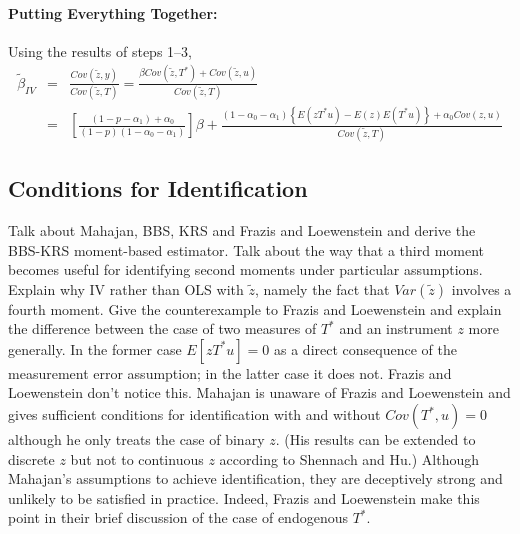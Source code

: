 \paragraph{Putting Everything Together:}
Using the results of steps 1--3,  
\begin{eqnarray*}
  \widetilde{\beta}_{IV} &=&  \frac{Cov\left( \widetilde{z},y \right)}{Cov(\widetilde{z},T)} = \frac{\beta Cov(\widetilde{z},T^*) + Cov(\widetilde{z},u)}{Cov(\widetilde{z},T)} \\
  &=& \left[\frac{(1- p - \alpha_1) + \alpha_0}{(1-p)(1 - \alpha_0 - \alpha_1)}\right]\beta + \frac{\left( 1-\alpha_0 - \alpha_1 \right)\left\{ E\left( zT^*u \right) - E(z)E(T^*u) \right\} + \alpha_0 Cov(z,u)}{Cov(\widetilde{z},T)}
\end{eqnarray*}

\subsection{Conditions for Identification}
Talk about Mahajan, BBS, KRS and Frazis and Loewenstein and derive the BBS-KRS moment-based estimator.
Talk about the way that a third moment becomes useful for identifying second moments under particular assumptions.
Explain why IV rather than OLS with $\widetilde{z}$, namely the fact that $Var(\widetilde{z})$ involves a fourth moment.
Give the counterexample to Frazis and Loewenstein and explain the difference between the case of two measures of $T^*$ and an instrument $z$ more generally.
In the former case $E[zT^*u]=0$ as a direct consequence of the measurement error assumption; in the latter case it does not.
Frazis and Loewenstein don't notice this.
Mahajan is unaware of Frazis and Loewenstein and gives sufficient conditions for identification with and without $Cov(T^*,u)=0$ although he only treats the case of binary $z$.
(His results can be extended to discrete $z$ but not to continuous $z$ according to Shennach and Hu.)
Although Mahajan's assumptions to achieve identification, they are deceptively strong and unlikely to be satisfied in practice.
Indeed, Frazis and Loewenstein make this point in their brief discussion of the case of endogenous $T^*$.














